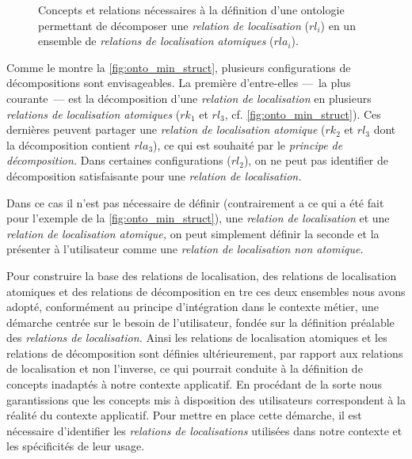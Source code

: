 \begin{figure}
  \centering
   
  \caption[Structure générale d'une ontologie de
  décomposition]{Concepts et relations nécessaires à la définition
    d'une ontologie permettant de décomposer une \emph{relation de
      localisation} ($rl_i$) en un ensemble de \emph{relations de
      localisation atomiques} ($rla_i$).}
  \label{fig:onto_min_struct}
\end{figure}


Comme le montre la \autoref{fig:onto_min_struct}, plusieurs
configurations de décompositions sont envisageables. La première
d'entre-elles ---~la plus courante~--- est la décomposition d'une
\emph{relation de localisation} en plusieurs \emph{relations de
  localisation atomiques} (\eg \(rk_1\) et \(rl_3\),
cf. \autoref{fig:onto_min_struct}).
%
Ces dernières peuvent partager une \emph{relation de localisation
  atomique} (\eg \(rk_2\) et \(rl_3\) dont la décomposition contient
\(rla_3\)), ce qui est souhaité par le \emph{principe de
  décomposition.}
%
Dans certaines configurations (\eg \(rl_2\)), on ne peut pas
identifier de décomposition satisfaisante pour une \emph{relation de
  localisation.}


Dans ce cas il
n'est pas nécessaire de définir (contrairement a ce qui a été fait
pour l'exemple de la \autoref{fig:onto_min_struct}), une
\emph{relation de localisation} et une \emph{relation de localisation
  atomique,} on peut simplement définir la seconde et la présenter à
l'utilisateur comme une \emph{relation de localisation non atomique.}

Pour construire la base des relations de localisation, des relations
de localisation atomiques et des relations de décomposition en tre ces
deux ensembles nous avons adopté, conformément au principe
d'intégration dans le contexte métier, une démarche centrée sur le
besoin de l'utilisateur, \ie fondée sur la définition préalable des
\emph{relations de localisation.} Ainsi les relations de localisation
atomiques et les relations de décomposition sont définies
ultérieurement, par rapport aux relations de localisation et non
l'inverse, ce qui pourrait conduite à la définition de concepts
inadaptés à notre contexte applicatif.  En procédant de la sorte nous
garantissions que les concepts mis à disposition des utilisateurs
correspondent à la réalité du contexte applicatif. Pour mettre en
place cette démarche, il est nécessaire d'identifier les
\emph{relations de localisations} utilisées dans notre contexte et les
spécificités de leur usage.



